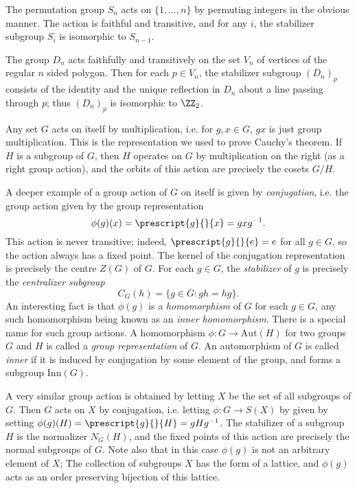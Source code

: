 \begin{example}
    The permutation group $S_n$ acts on $\{ 1, \dots, n \}$ by permuting integers in the obvious manner. The action is faithful and transitive, and for any $i$, the stabilizer subgroup $S_i$ is isomorphic to $S_{n-1}$.
\end{example}

\begin{example}
    The group $D_n$ acts faithfully and transitively on the set $V_n$ of vertices of the regular $n$ sided polygon. Then for each $p \in V_n$, the stabilizer subgroup $(D_n)_p$ consists of the identity and the unique reflection in $D_n$ about a line passing through $p$; thus $(D_n)_p$ is isomorphic to $\ZZ_2$.
\end{example}

\begin{example}
    Any set $G$ acts on itself by multiplication, i.e. for $g,x \in G$, $gx$ is just group multiplication. This is the representation we used to prove Cauchy's theorem. If $H$ is a subgroup of $G$, then $H$ operates on $G$ by multiplication on the right (as a right group action), and the orbits of this action are precisely the cosets $G/H$.
\end{example}

\begin{example}
    A deeper example of a group action of $G$ on itself is given by \emph{conjugation}, i.e. the group action given by the group representation
    \[ \phi(g)(x) = \prescript{g}{}{x} = gxg^{-1}. \]
    This action is never transitive; indeed, $\prescript{g}{}{e} = e$ for all $g \in G$, so the action always has a fixed point. The kernel of the conjugation representation is precisely the centre $Z(G)$ of $G$. For each $g \in G$, the \emph{stabilizer} of $g$ is precisely the \emph{centralizer subgroup}
    \[ C_G(h) = \{ g \in G: gh = hg \}. \]
    An interesting fact is that $\phi(g)$ is a \emph{homomorphism} of $G$ for each $g \in G$, any such homomorphism being known as an \emph{inner homomorphism}. There is a special name for such group actions. A homomorphism $\phi: G \to \text{Aut}(H)$ for two groups $G$ and $H$ is called a \emph{group representation} of $G$. An automorphism of $G$ is called \emph{inner} if it is induced by conjugation by some element of the group, and forms a subgroup $\text{Inn}(G)$.
\end{example}

\begin{example}
    A very similar group action is obtained by letting $X$ be the set of all subgroups of $G$. Then $G$ acts on $X$ by conjugation, i.e. letting $\phi: G \to S(X)$ by given by setting $\phi(g)(H) = \prescript{g}{}{H} = gHg^{-1}$. The stabilizer of a subgroup $H$ is the normalizer $N_G(H)$, and the fixed points of this action are precisely the normal subgroups of $G$. Note also that in this case $\phi(g)$ is not an arbitrary element of $X$; The collection of subgroups $X$ has the form of a lattice, and $\phi(g)$ acts as an order preserving bijection of this lattice.
\end{example}

